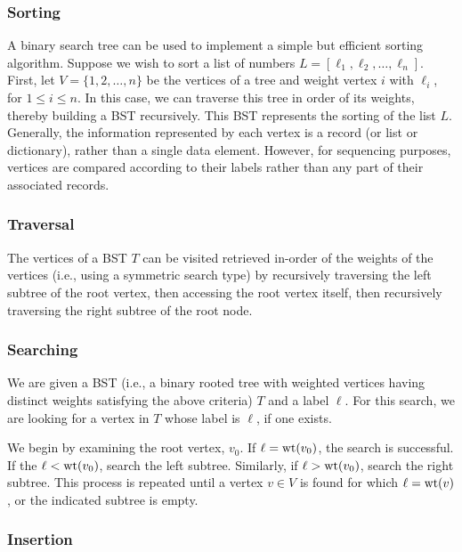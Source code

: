 \subsubsection{Sorting}

A binary search tree can be used to implement a simple but efficient
sorting algorithm. Suppose we wish to sort a list of numbers
$L = [\ell_1, \ell_2,\dots, \ell_n]$. First, let $V=\{1,2,\dots,n\}$
be the vertices of a tree and weight vertex $i$ with $\ell_i$,
for $1\leq i\leq n$. In this case, we can traverse this tree
in order of its weights, thereby building a BST recursively.
This BST represents the sorting of the list $L$.
Generally, the information represented by each vertex is a
record (or list or dictionary), rather than a single data element. However,
for sequencing purposes, vertices are compared according to their
labels rather than any part of their associated records.

\subsubsection{Traversal}

The vertices of a BST $T$ can be visited retrieved in-order of the
weights of the vertices (i.e.,
using a symmetric search type) by recursively  traversing the left subtree of the
root vertex, then accessing the root vertex itself, then recursively traversing the
right subtree of the root node.

\subsubsection{Searching}

We are given a BST (i.e., a binary rooted tree with weighted vertices
having distinct weights satisfying the above criteria) $T$ and a
label $\ell$. For this search, we are looking for a vertex in $T$
whose label is $\ell$, if one exists.

We begin by examining the root vertex, $v_0$. If $\ell={\rm wt}(v_0)$,
the search is successful. If the $\ell<{\rm wt}(v_0)$,
search the left subtree. Similarly, if $\ell>{\rm wt}(v_0)$,
search the right subtree. This process is repeated until a vertex
$v\in V$ is found for which $\ell={\rm wt}(v)$,
or the indicated subtree is empty.


\subsubsection{Insertion}

